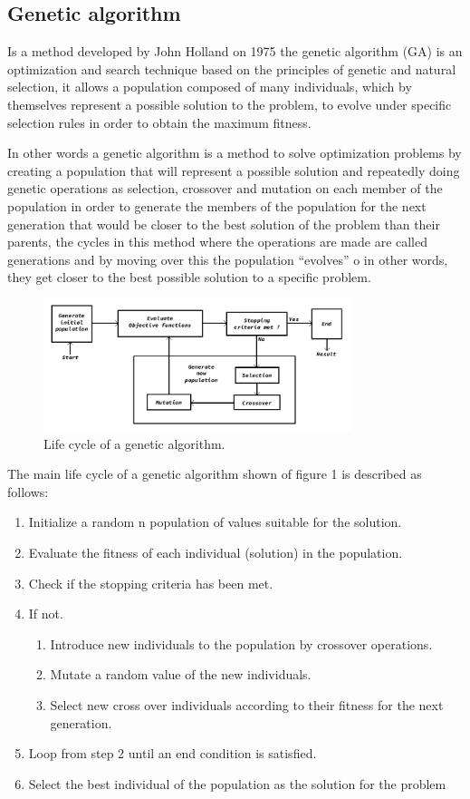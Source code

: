 \documentclass[conference]{IEEEtran}
\begin{document}
\subsection{Genetic algorithm}
Is a method developed by John Holland on 1975 \cite{Holland1975} the genetic algorithm (GA) is an optimization and search technique based on the principles of genetic and natural selection, it allows a population composed of many individuals, which by themselves represent a possible solution to the problem, to evolve under specific selection rules in order to obtain the maximum fitness.

In other words a genetic algorithm is a method to solve optimization problems by creating a population that will represent a possible solution and repeatedly doing genetic operations as selection, crossover and mutation on each member of the population in order to generate the members of the population for the next generation that would be closer to the best solution of the problem than their parents, the cycles in this method where the operations are made are called generations and by moving over this the population “evolves” o in other words, they get closer to the best possible solution  to a specific problem.

\begin{figure}[htbp]
\centerline{\includegraphics[width=90mm]{Images/ga_life_cycle.png}}
\caption{Life cycle of a genetic algorithm.}
\label{fig}
\end{figure}

The main life cycle of a genetic algorithm shown of figure 1 is described as follows:
\begin{enumerate}
    \item Initialize a random n population of values suitable for the solution.
    \item Evaluate the fitness of each individual (solution) in the population.
    \item Check if the stopping criteria has been met.
    \item If not.
    \begin{enumerate}
        \item Introduce new individuals to the population by crossover operations.
        \item Mutate a random value of the new individuals.
        \item Select new cross over individuals according to their fitness for the next generation.
    \end{enumerate}
    \item Loop from step 2 until an end condition is satisfied.
    \item Select the best individual of the population as the solution for the problem
\end{enumerate}
\end{document}
